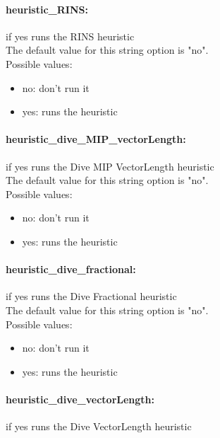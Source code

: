 \paragraph{heuristic\_RINS:}\label{sec:heuristic_RINS} if yes runs the RINS heuristic $\;$ \\

The default value for this string option is "no".
\\ 
Possible values:
\begin{itemize}
   \item no: don't run it
   \item yes: runs the heuristic
\end{itemize}

\paragraph{heuristic\_dive\_MIP\_vectorLength:}\label{sec:heuristic_dive_MIP_vectorLength} if yes runs the Dive MIP VectorLength heuristic $\;$ \\

The default value for this string option is "no".
\\ 
Possible values:
\begin{itemize}
   \item no: don't run it
   \item yes: runs the heuristic
\end{itemize}

\paragraph{heuristic\_dive\_fractional:}\label{sec:heuristic_dive_fractional} if yes runs the Dive Fractional heuristic $\;$ \\

The default value for this string option is "no".
\\ 
Possible values:
\begin{itemize}
   \item no: don't run it
   \item yes: runs the heuristic
\end{itemize}

\paragraph{heuristic\_dive\_vectorLength:}\label{sec:heuristic_dive_vectorLength} if yes runs the Dive VectorLength heuristic $\;$ \\

